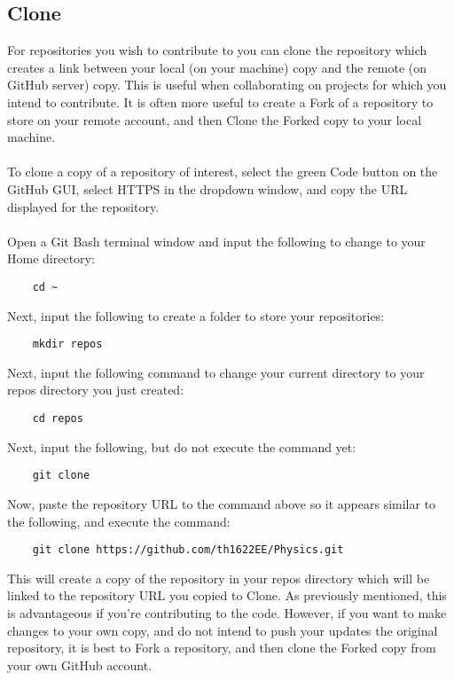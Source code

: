 \documentclass{article}
\begin{document}
\subsection*{Clone}
For repositories you wish to contribute to you can clone the repository which creates a link between your local (on your machine) copy and the remote (on GitHub server) copy. This is useful when collaborating on projects for which you intend to contribute. It is often more useful to create a Fork of a repository to store on your remote account, and then Clone the Forked copy to your local machine.\\\\
To clone a copy of a repository of interest, select the green Code button on the GitHub GUI, select HTTPS in the dropdown window, and copy the URL displayed for the repository.\\\\
Open a Git Bash terminal window and input the following to change to your Home directory:
\begin{verbatim}
    cd ~
\end{verbatim}
Next, input the following to create a folder to store your repositories:
\begin{verbatim}
    mkdir repos
\end{verbatim}
Next, input the following command to change your current directory to your repos directory you just created:
\begin{verbatim}
    cd repos
\end{verbatim}
Next, input the following, but do not execute the command yet:
\begin{verbatim}
    git clone 
\end{verbatim}
Now, paste the repository URL to the command above so it appears similar to the following, and execute the command:
\begin{verbatim}
    git clone https://github.com/th1622EE/Physics.git
\end{verbatim}
This will create a copy of the repository in your repos directory which will be linked to the repository URL you copied to Clone. As previously mentioned, this is advantageous if you're contributing to the code. However, if you want to make changes to your own copy, and do not intend to push your updates the original repository, it is best to Fork a repository, and then clone the Forked copy from your own GitHub account.
\end{document}
